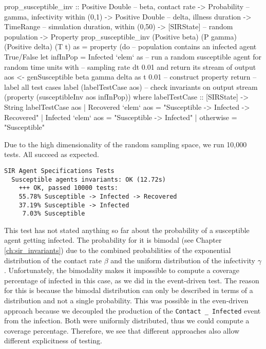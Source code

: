 \begin{HaskellCode}
prop_susceptible_inv :: Positive Double -- beta, contact rate
                     -> Probability     -- gamma, infectivity within (0,1)
                     -> Positive Double -- delta, illness duration
                     -> TimeRange       -- simulation duration, within (0,50)
                     -> [SIRState]      -- random population
                     -> Property
prop_susceptible_inv
      (Positive beta) (P gamma) (Positive delta) (T t) as = property (do  
    -- population contains an infected agent True/False
    let infInPop = Infected `elem` as
    -- run a random susceptible agent for random time units with 
    -- sampling rate dt 0.01 and return its stream of output
    aos <- genSusceptible beta gamma delta as t 0.01
    -- construct property
    return 
        -- label all test cases
        label (labelTestCase aos) 
        -- check invariants on output stream
        (property (susceptibleInv aos infInPop))
  where
    labelTestCase :: [SIRState] -> String
    labelTestCase aos
      | Recovered `elem` aos = "Susceptible -> Infected -> Recovered"
      | Infected `elem` aos  = "Susceptible -> Infected"
      | otherwise            = "Susceptible"
\end{HaskellCode}

Due to the high dimensionality of the random sampling space, we run 10,000 tests. All succeed as expected.

\begin{verbatim}
SIR Agent Specifications Tests
  Susceptible agents invariants: OK (12.72s)
    +++ OK, passed 10000 tests:
    55.78% Susceptible -> Infected -> Recovered
    37.19% Susceptible -> Infected
     7.03% Susceptible
\end{verbatim}

This test has not stated anything so far about the probability of a susceptible agent getting infected. The probability for it is bimodal (see Chapter \ref{ch:sir_invariants}) due to the combined probabilities of the exponential distribution of the contact rate $\beta$ and the uniform distribution of the infectivity $\gamma$. Unfortunately, the bimodality makes it impossible to compute a coverage percentage of infected in this case, as we did in the event-driven test. The reason for this is because the bimodal distribution can only be described in terms of a distribution and not a single probability. This was possible in the even-driven approach because we decoupled the production of the \texttt{Contact \_ Infected} event from the infection. Both were uniformly distributed, thus we could compute a coverage percentage. Therefore, we see that different approaches also allow different explicitness of testing.

